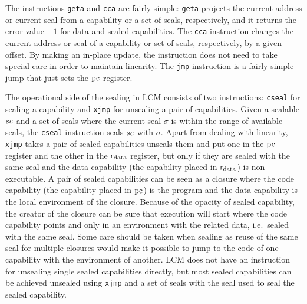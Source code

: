 \documentclass[acmsmall,review,anonymous]{acmart}\settopmatter{printfolios=true,printccs=false,printacmref=false}
\newcommand{\trgcm}{\textsc{LCM}}
\begin{document}
The instructions \texttt{geta} and \texttt{cca} are fairly simple: \texttt{geta} projects the current address or current seal from a capability or a set of seals, respectively, and it returns the error value $-1$ for data and sealed capabilities.
The \texttt{cca} instruction changes the current address or seal of a capability or set of seals, respectively, by a given offset.
By making an in-place update, the instruction does not need to take special care in order to maintain linearity.
The \texttt{jmp} instruction is a fairly simple jump that just sets the $\mathrm{pc}$-register.

The operational side of the sealing in \trgcm{} consists of two instructions: \texttt{cseal} for sealing a capability and \texttt{xjmp} for unsealing a pair of capabilities.
Given a sealable $\mathit{sc}$ and a set of seals where the current seal $\sigma$ is within the range of available seals, the \texttt{cseal} instruction seals $\mathit{sc}$ with $\sigma$.
Apart from dealing with linearity, \texttt{xjmp} takes a pair of sealed capabilities unseals them and put one in the $\mathrm{pc}$ register and the other in the $\mathrm{r}_\mathrm{data}$ register, but only if they are sealed with the same seal and the data capability (the capability placed in $\mathrm{r}_\mathrm{data}$) is non-executable.
A pair of sealed capabilities can be seen as a closure where the code capability (the capability placed in $\mathrm{pc}$) is the program and the data capability is the local environment of the closure.
Because of the opacity of sealed capability, the creator of the closure can be sure that execution will start where the code capability points and only in an environment with the related data, i.e.\ sealed with the same seal.
Some care should be taken when sealing as reuse of the same seal for multiple closures would make it possible to jump to the code of one capability with the environment of another.
\trgcm{} does not have an instruction for unsealing single sealed capabilities directly, but most sealed capabilities can be achieved unsealed using \texttt{xjmp} and a set of seals with the seal used to seal the sealed capability.
\end{document}
